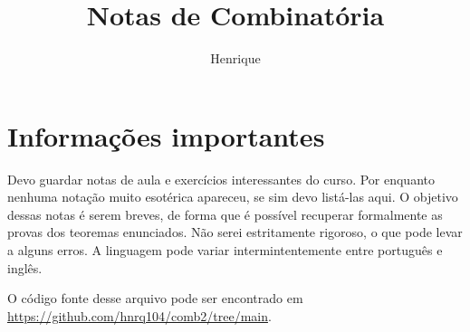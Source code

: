 \documentclass[reqno, 12pt]{article}
\author{
	Henrique
}
\title{Notas de Combinatória}
\theoremstyle{definition}
\begin{document}
\maketitle

\tableofcontents
\setcounter{section}{-1}

\section{Informações importantes}
Devo guardar notas de aula e exercícios interessantes do curso. Por
enquanto nenhuma notação muito esotérica apareceu,
se sim devo listá-las aqui. O objetivo dessas notas é serem breves,
de forma que é possível recuperar formalmente as provas dos
teoremas enunciados. Não serei estritamente rigoroso, o que pode
levar a alguns erros. A linguagem pode variar intermintentemente entre
português e inglês.

O código fonte desse arquivo pode ser encontrado em
\url{https://github.com/hnrq104/comb2/tree/main}.





% 

\appendix

\end{document}
